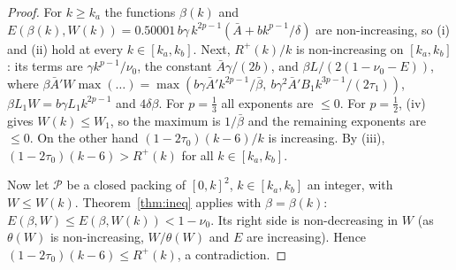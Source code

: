 \documentclass[11pt]{amsart}
\newcommand{\cP}{\mathcal P}
\newcommand{\bbar}{\bar\beta}
\newcommand{\Abar}{\bar A}
\theoremstyle{definition}
\theoremstyle{remark}
\numberwithin{equation}{section}
\begin{document}
\begin{proof}
For $k\ge k_a$ the functions $\beta(k)$ and $E(\beta(k),W(k))=0.50001\,b\gamma\,k^{2p-1}(\Abar+bk^{p-1}/\delta)$ are
non-increasing, so (i) and (ii) hold at every $k\in[k_a,k_b]$. Next, $R^+(k)/k$ is non-increasing on $[k_a,k_b]$: its terms
are $\gamma k^{p-1}/\nu_0$, the constant $\Abar\gamma/(2b)$, and $\beta L/(2(1-\nu_0-E))$, where
$\beta\bar A'W\max(\dots)=\max(b\gamma\bar A'k^{2p-1}/\bbar,\ b\gamma^2\bar A'B_1k^{3p-1}/(2\tau_1))$,
$\beta L_1W=b\gamma L_1k^{2p-1}$ and $4\delta\beta$. For $p=\frac13$ all exponents are $\le0$. For $p=\frac12$, (iv) gives $W(k)\le W_1$, so the maximum is
$1/\bbar$ and the remaining exponents are $\le0$. On the other hand $(1-2\tau_0)(k-6)/k$ is increasing. By (iii),
$(1-2\tau_0)(k-6)>R^+(k)$ for all $k\in[k_a,k_b]$.

Now let $\cP$ be a closed packing of $[0,k]^2$, $k\in[k_a,k_b]$ an integer, with $W\le W(k)$. Theorem~\ref{thm:ineq}
applies with $\beta=\beta(k)$: $E(\beta,W)\le E(\beta,W(k))<1-\nu_0$. Its right side is non-decreasing in $W$ (as
$\theta(W)$ is non-increasing, $W/\theta(W)$ and $E$ are increasing). Hence
$(1-2\tau_0)(k-6)\le R^+(k)$, a contradiction.
\end{proof}
\end{document}
